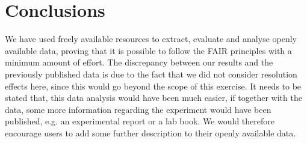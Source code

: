 \documentclass[aps,prx,reprint,amsmath,amssymb,superscriptaddress,showpacs]{revtex4-1}
\begin{document}
\section{Conclusions}

We have used freely available resources to extract, evaluate and analyse openly available data, proving that it is possible to follow the FAIR principles with a minimum amount of effort. 
The discrepancy between our results and the previously published data \cite{Aouissi} is due to the fact that we did not consider resolution effects here, since this would go beyond the scope of this exercise.
It needs to be stated that, this data analysis would have been much easier, if together with the data, some more information regarding the experiment would have been published, e.g. an experimental report or a lab book.
We would therefore encourage users to add some further description to their openly available data. 









\end{document}
